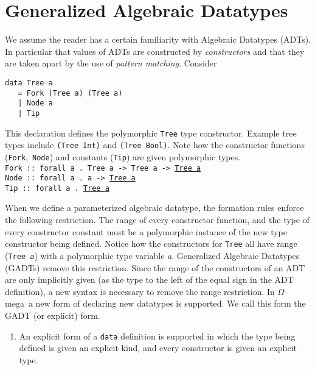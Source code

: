 \documentclass[11pt,twoside]{article}
\newcommand{\om}{$\Omega$mega}
\begin{document}
\section{Generalized Algebraic Datatypes} \label{gadt}

We assume the reader has a certain familiarity with Algebraic Datatypes
(ADTs). In particular that values of ADTs are constructed by {\em constructors}
and that they are taken apart by the use of {\em pattern matching}. Consider

\begin{verbatim}
data Tree a 
   = Fork (Tree a) (Tree a) 
   | Node a 
   | Tip
\end{verbatim}
This declaration defines the polymorphic {\tt Tree} type constructor. Example tree
types include {\tt (Tree Int)} and {\tt (Tree Bool)}. 
Note how the constructor functions ({\tt Fork},\ {\tt Node}) and constants ({\tt Tip})
are given polymorphic types.\vspace*{0.1in} \\
\noindent
{\tt Fork :: forall a . Tree a -> Tree a -> \underline{Tree a}}\\
{\tt Node :: forall a . a -> \underline{Tree a}}\\
{\tt Tip :: forall a . \underline{Tree a}} \vspace*{0.1in}

When we define a parameterized algebraic
datatype, the formation rules enforce the following restriction. The
range of every constructor function, and the type of every constructor
constant must be a polymorphic instance of the new type constructor being
defined. Notice how the constructors for {\tt Tree} all have range
({\tt Tree {\it a}}) with a polymorphic type variable {\it a}. 
Generalized Algebraic Datatypes (GADTs) remove this restriction.
Since the range of the constructors of an ADT are only implicitly
given (as the type to the left of the equal sign in the ADT definition),
a new syntax is necessary to remove the range restriction. In \om\
a new form of declaring new datatypes is supported. We call this form
the GADT (or explicit) form.
\begin{enumerate}

\item An explicit form of a {\tt data} definition is supported in which
the type being defined is given an explicit kind, and every constructor is
given an explicit type.

\end{enumerate}
\end{document}
